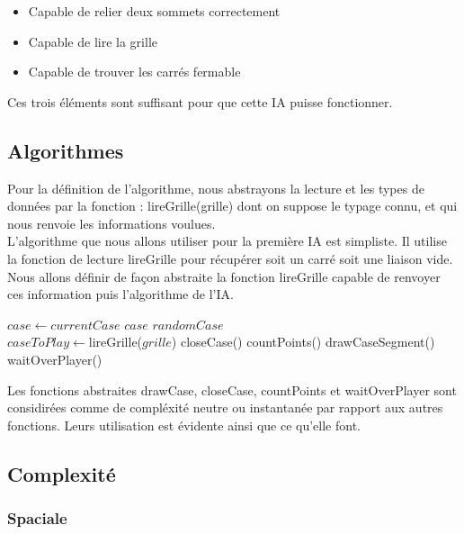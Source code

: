\documentclass[a4paper,12pt]{report}
\begin{document}
\begin{itemize}
 \item Capable de relier deux sommets correctement
 \item Capable de lire la grille
 \item Capable de trouver les carr\'es fermable
\end{itemize}

Ces trois \'el\'ements sont suffisant pour que cette IA puisse fonctionner.

\subsection{Algorithmes}

Pour la d\'efinition de l'algorithme, nous abstrayons la lecture et les types de donn\'ees par la fonction : lireGrille(grille) dont on suppose le typage connu, et qui nous renvoie les informations voulues. \\
L'algorithme que nous allons utiliser pour la premi\`ere IA est simpliste. Il utilise la fonction de lecture lireGrille pour r\'ecup\'erer soit un carr\'e soit une liaison vide. Nous allons d\'efinir de fa\c{c}on abstraite la fonction lireGrille capable de renvoyer ces information puis l'algorithme de l'IA. \\
\begin{algorithmic}
	\State $case \gets currentCase$
			\State \Return $case$
		\Else
				\State \Return $randomCase$
			\EndIf
		\EndIf
	\EndFor
\EndFunction
\\
		\State $caseToPlay\gets$lireGrille($grille$)
			\State closeCase()
			\State countPoints()
		\Else
			\State drawCaseSegment()
		\EndIf
		\State waitOverPlayer()
	\EndWhile
\EndFunction
\end{algorithmic}
Les fonctions abstraites drawCase, closeCase, countPoints et waitOverPlayer sont considir\'ees comme de compl\'exit\'e neutre ou instantan\'ee par rapport aux autres fonctions. Leurs utilisation est \'evidente ainsi que ce qu'elle font.

\subsection{Complexit\'e}

\subsubsection{Spaciale}
\end{document}
